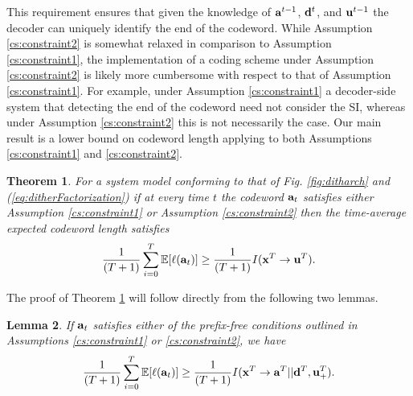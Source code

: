 \documentclass[letterpaper, 10 pt, conference]{ieeeconf}  %
\newtheorem{theorem}{Theorem}
\newtheorem{lemma}[theorem]{Lemma}
\newcounter{constraint}[section]
\newcommand{\rs}[1]{\mathbf{\MakeLowercase{#1}}}
\begin{document}
This requirement ensures that given the knowledge of $\rs{a}^{t-1}$, $\rs{d}^{t}$, and $\rs{u}^{t-1}$ the decoder can uniquely identify the end of the codeword. While Assumption \ref{cs:constraint2} is somewhat relaxed in comparison to Assumption \ref{cs:constraint1}, the implementation of a coding scheme under Assumption \ref{cs:constraint2} is likely more cumbersome with respect to that of Assumption \ref{cs:constraint1}.  For example, under Assumption \ref{cs:constraint1} a decoder-side system that detecting the end of the codeword need not consider the SI, whereas under Assumption \ref{cs:constraint2} this is not necessarily the case. Our main result is a lower bound on codeword length applying to both Assumptions \ref{cs:constraint1} and \ref{cs:constraint2}.
\begin{theorem}\label{thm:converse}
    For a system model conforming to that of  Fig. \ref{fig:ditharch} and (\ref{eq:ditherFactorization}) if at every time $t$ the codeword $\rs{a}_t$ satisfies either Assumption \ref{cs:constraint1}
 or Assumption \ref{cs:constraint2}  then the time-average expected codeword length satisfies
 \begin{align} \label{eq:converse_thm}   \frac{1}{(T+1)}\sum_{i=0}^{T}\mathbb{E}[\ell(\rs{a}_t)] \ge \frac{1}{(T+1)}I(\rs{x}^T\rightarrow\rs{u}^{T}).
 \end{align}
\end{theorem}
The proof of Theorem \ref{thm:converse} will follow directly from the following two lemmas. 
\begin{lemma}\label{lemm:milb}
If $\rs{a}_t$ satisfies either of the prefix-free conditions outlined in Assumptions \ref{cs:constraint1} or \ref{cs:constraint2}, we have
\begin{align}\label{eq:lb_lemm}
    \frac{1}{(T+1)}\sum_{i=0}^{T}\mathbb{E}[\ell(\rs{a}_t)] \ge \frac{1}{(T+1)}I(\rs{x}^T\rightarrow\rs{a}^{T}||\rs{d}^{T},\rs{u}_{+}^{T}).\linebreak
\end{align}
\end{lemma}
\end{document}

